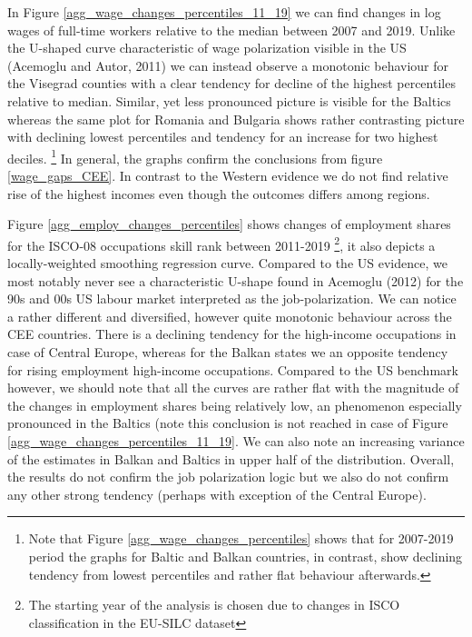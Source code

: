 \documentclass{article}
\begin{document}
In Figure \ref{agg_wage_changes_percentiles_11_19} we can find changes in log wages of full-time workers relative to the median between 2007 and 2019. Unlike the U-shaped curve characteristic of wage polarization visible in the US (Acemoglu and Autor, 2011) we can instead observe a monotonic behaviour for the Visegrad counties with a clear tendency for decline of the highest percentiles relative to median. Similar, yet less pronounced picture is visible for the Baltics whereas the same plot for Romania and Bulgaria shows rather contrasting picture with declining lowest percentiles and tendency for an increase for two highest deciles.
\footnote{Note that Figure \ref{agg_wage_changes_percentiles} shows that for 2007-2019 period the graphs for Baltic and Balkan countries, in contrast, show declining tendency from lowest percentiles and rather flat behaviour afterwards.} In general, the graphs confirm the conclusions from figure \ref{wage_gaps_CEE}. In contrast to the Western evidence we do not find relative rise of the highest incomes even though the outcomes differs among regions.


Figure \ref{agg_employ_changes_percentiles} shows changes of employment shares for the ISCO-08 occupations skill rank between 2011-2019 \footnote{The starting year of the analysis is chosen due to changes in ISCO classification in the EU-SILC dataset}, it also depicts a locally-weighted smoothing regression curve. Compared to the US evidence, we most notably never see a characteristic U-shape found in Acemoglu (2012) for the 90s and 00s US labour market interpreted as the job-polarization. We can notice a rather different and diversified, however quite monotonic behaviour across the CEE countries. There is a declining tendency for the high-income occupations in case of Central Europe, whereas for the Balkan states we an opposite tendency for rising employment high-income occupations. Compared to the US benchmark however, we should note that all the curves are rather flat with the magnitude of the changes in employment shares being relatively low, an phenomenon especially pronounced in the Baltics (note this conclusion is not reached in case of Figure \ref{agg_wage_changes_percentiles_11_19}. We can also note an increasing variance of the estimates in Balkan and Baltics in upper half of the distribution. Overall, the results do not confirm the job polarization logic but we also do not confirm any other strong tendency (perhaps with exception of the Central Europe). 
\end{document}
